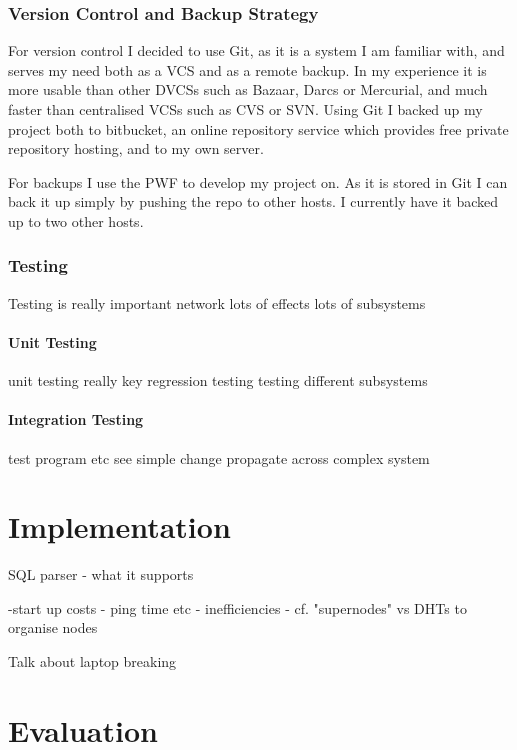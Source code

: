\documentclass[12pt,twoside,notitlepage]{report}
\begin{document}
\subsection{Version Control and Backup Strategy}

For version control I decided to use Git, as it is a system I am familiar with, and serves my need
both as a VCS and as a remote backup. In my experience it is more usable than other DVCSs such as
Bazaar, Darcs or Mercurial, and much faster than centralised VCSs such as CVS or SVN. Using Git I
backed up my project both to bitbucket, an online repository service which provides free private
repository hosting, and to my own server.

For backups I use the PWF to develop my project on. As it is stored in Git I can back it up simply
by pushing the repo to other hosts. I currently have it backed up to two other hosts.

\subsection{Testing}

Testing is really important
network
lots of effects
lots of subsystems

\subsubsection{Unit Testing}

unit testing really key
regression testing
testing different subsystems

\subsubsection{Integration Testing}

test program etc
see simple change propagate across complex system



\cleardoublepage
\chapter{Implementation}

SQL parser
- what it supports

-start up costs
  - ping time etc
  - inefficiencies
  - cf. "supernodes" vs DHTs to organise nodes

Talk about laptop breaking


\cleardoublepage
\chapter{Evaluation}
\end{document}
